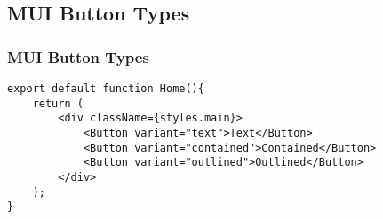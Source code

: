 \documentclass{beamer}
\begin{document}
\subsection{MUI Button Types}
\begin{frame}[fragile]
\frametitle{MUI Button Types}
\begin{lstlisting}
export default function Home(){
    return (
        <div className={styles.main}>
            <Button variant="text">Text</Button>
            <Button variant="contained">Contained</Button>
            <Button variant="outlined">Outlined</Button>
        </div>
    );
}
\end{lstlisting}
\end{frame}
\end{document}
